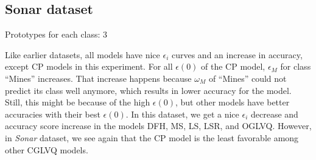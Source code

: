 \subsection{Sonar dataset}

Prototypes for each class: 3
\vspace{5pt}


Like earlier datasets, all models have nice $\epsilon_{i}$ curves and an increase in accuracy, except CP models in this experiment. For all $\epsilon(0)$ of the CP model, $\epsilon_{M}$ for class “Mines” increases. That increase happens because $\omega_{M}$ of “Mines” could not predict its class well anymore, which results in lower accuracy for the model. Still, this might be because of the high $\epsilon(0)$, but other models have better accuracies with their best $\epsilon(0)$. In this dataset, we get a nice $\epsilon_{i}$ decrease and accuracy score increase in the models DFH, MS, LS, LSR, and OGLVQ. However, in \textit{Sonar} dataset, we see again that the CP model is the least favorable among other CGLVQ models.



